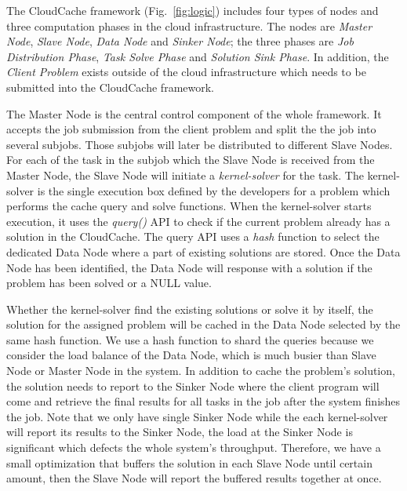 The CloudCache framework (Fig.~\ref{fig:logic}) includes four types of nodes and three computation phases in the cloud infrastructure. The nodes are \emph{Master Node}, \emph{Slave Node}, \emph{Data Node} and \emph{Sinker Node}; the three phases are \emph{Job Distribution Phase}, \emph{Task Solve Phase} and \emph{Solution Sink Phase}. In addition, the \emph{Client Problem} exists outside of the cloud infrastructure which needs to be submitted into the CloudCache framework.

The Master Node is the central control component of the whole framework. It accepts the job submission from the client problem and split the the job into several subjobs. Those subjobs will later be distributed to different Slave Nodes. For each of the task in the subjob which the Slave Node is received from the Master Node, the Slave Node will initiate a \emph{kernel-solver} for the task. The kernel-solver is the single execution box defined by the developers for a problem which performs the cache query and solve functions. When the kernel-solver starts execution, it uses the \emph{query()} API to check if the current problem already has a solution in the CloudCache. The query API uses a \emph{hash} function to select the dedicated Data Node where a part of existing solutions are stored. Once the Data Node has been identified, the Data Node will response with a solution if the problem has been solved or a NULL value.

Whether the kernel-solver find the existing solutions or solve it by itself, the solution for the assigned problem will be cached in the Data Node selected by the same hash function. We use a hash function to shard the queries because we consider the load balance of the Data Node, which is much busier than Slave Node or Master Node in the system. In addition to cache the problem's solution, the solution needs to report to the Sinker Node where the client program will come and retrieve the final results for all tasks in the job after the system finishes the job. Note that we only have single Sinker Node while the each kernel-solver will report its results to the Sinker Node, the load at the Sinker Node is significant which defects the whole system's throughput. Therefore, we have a small optimization that buffers the solution in each Slave Node until certain amount, then the Slave Node will report the buffered results together at once.

